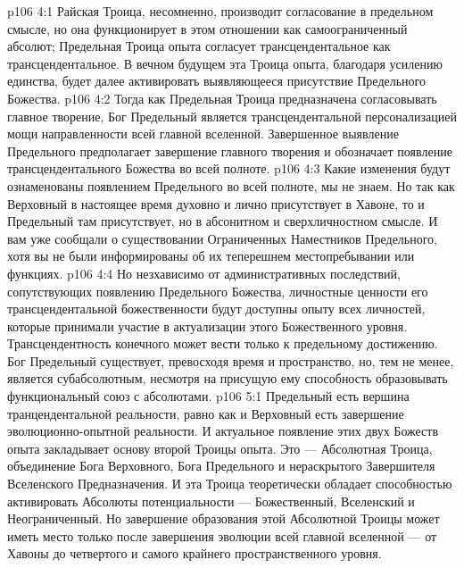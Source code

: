 \vs p106 4:1 Райская Троица, несомненно, производит согласование в предельном смысле, но она функционирует в этом отношении как самоограниченный абсолют; Предельная Троица опыта согласует трансцендентальное как трансцендентальное. В вечном будущем эта Троица опыта, благодаря усилению единства, будет далее активировать выявляющееся присутствие Предельного Божества.
\vs p106 4:2 Тогда как Предельная Троица предназначена согласовывать главное творение, Бог Предельный является трансцендентальной персонализацией мощи направленности всей главной вселенной. Завершенное выявление Предельного предполагает завершение главного творения и обозначает появление трансцендентального Божества во всей полноте.
\vs p106 4:3 Какие изменения будут ознаменованы появлением Предельного во всей полноте, мы не знаем. Но так как Верховный в настоящее время духовно и лично присутствует в Хавоне, то и Предельный там присутствует, но в абсонитном и сверхличностном смысле. И вам уже сообщали о существовании Ограниченных Наместников Предельного, хотя вы не были информированы об их теперешнем местопребывании или функциях.
\vs p106 4:4 Но незхависимо от административных последствий, сопутствующих появлению Предельного Божества, личностные ценности его трансцендентальной божественности будут доступны опыту всех личностей, которые принимали участие в актуализации этого Божественного уровня. Трансцендентность конечного может вести только к предельному достижению. Бог Предельный существует, превосходя время и пространство, но, тем не менее, является субабсолютным, несмотря на присущую ему способность образовывать функциональный союз с абсолютами.
\vs p106 5:1 Предельный есть вершина транцендентальной реальности, равно как и Верховный есть завершение эволюционно\hyp{}опытной реальности. И актуальное появление этих двух Божеств опыта закладывает основу второй Троицы опыта. Это --- Абсолютная Троица, объединение Бога Верховного, Бога Предельного и нераскрытого Завершителя Вселенского Предназначения. И эта Троица теоретически обладает способностью активировать Абсолюты потенциальности --- Божественный, Вселенский и Неограниченный. Но завершение образования этой Абсолютной Троицы может иметь место только после завершения эволюции всей главной вселенной --- от Хавоны до четвертого и самого крайнего пространственного уровня.
